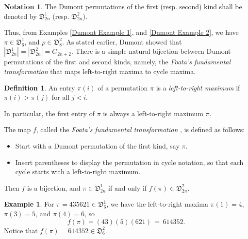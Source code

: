 \documentclass[
final
]{dmtcs-episciences}
\theoremstyle{definition}
\newtheorem{definition}[theorem]{Definition}
\newtheorem{notation}[theorem]{Notation}
\newtheorem{example}[theorem]{Example}
\theoremstyle{remark}
\begin{document}
\begin{notation} The Dumont permutations of the first (resp. second) kind shall be denoted by $\mathfrak{D}^1_{2n}$ (resp. $\mathfrak{D}^2_{2n}$).
\end{notation}

Thus, from Examples \ref{Dumont Example 1}, and \ref{Dumont Example 2}, we have $\pi \in \mathfrak{D}^1_{6}$, and $\rho \in \mathfrak{D}^2_{8}$.  As stated earlier, Dumont \cite {Dumont} showed that $|\mathfrak{D}^1_{2n}| = |\mathfrak{D}^2_{2n}| = G_{2n+2}$.  There is a simple natural bijection \cite {Dumont_Foata} between Dumont permutations of the first and second kinds, namely, the \emph{Foata's fundamental transformation} \cite{Foata} that maps left-to-right maxima to cycle maxima.


\begin{definition}
An entry $\pi(i)$ of a permutation $\pi$ is a \emph{left-to-right maximum} if $\pi(i)>\pi(j)$ for all $j<i$.
\end{definition}

In particular, the first entry of $\pi$ is always a left-to-right maximum $\pi$.

The map $f$, called the \emph{Foata's fundamental transformation} \cite{Foata}, is defined as follows:

\begin{itemize}
\item Start with a Dumont permutation of the first kind, say $\pi$.
\item Insert parentheses to display the permutation in cycle notation, so that each cycle starts with a left-to-right maximum.
\end{itemize}

Then $f$ is a bijection, and $\pi\in\mathfrak{D}^1_{2n}$ if and only if $f(\pi)\in\mathfrak{D}^2_{2n}$.

\begin{example}
For $\pi = 435621 \in \mathfrak{D}^1_{6}$, we have the left-to-right maxima $\pi(1)=4$, $\pi(3)=5$, and $\pi(4)=6$, so
$$f(\pi)= (43) (5) (621) \, = \, 614352.$$
Notice that $f(\pi) = 614352 \in \mathfrak{D}^2_{6}.$
\end{example}
\end{document}

